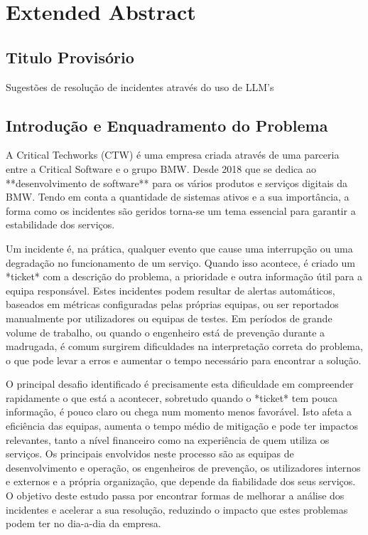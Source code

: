 
\chapter{Extended Abstract} %

\section{Titulo Provisório}
	Sugestões de resolução de incidentes através do uso de LLM’s

\section{Introdução e Enquadramento do Problema}
	A Critical Techworks (CTW) é uma empresa criada através de uma parceria entre a Critical Software e o grupo BMW. Desde 2018 que se dedica ao **desenvolvimento de software** para os vários produtos e serviços digitais da BMW. Tendo em conta a quantidade de sistemas ativos e a sua importância, a forma como os incidentes são geridos torna-se um tema essencial para garantir a estabilidade dos serviços.
	
	Um incidente é, na prática, qualquer evento que cause uma interrupção ou uma degradação no funcionamento de um serviço. Quando isso acontece, é criado um *ticket* com a descrição do problema, a prioridade e outra informação útil para a equipa responsável. Estes incidentes podem resultar de alertas automáticos, baseados em métricas configuradas pelas próprias equipas, ou ser reportados manualmente por utilizadores ou equipas de testes. Em períodos de grande volume de trabalho, ou quando o engenheiro está de prevenção durante a madrugada, é comum surgirem dificuldades na interpretação correta do problema, o que pode levar a erros e aumentar o tempo necessário para encontrar a solução.
	
	O principal desafio identificado é precisamente esta dificuldade em compreender rapidamente o que está a acontecer, sobretudo quando o *ticket* tem pouca informação, é pouco claro ou chega num momento menos favorável. Isto afeta a eficiência das equipas, aumenta o tempo médio de mitigação e pode ter impactos relevantes, tanto a nível financeiro como na experiência de quem utiliza os serviços. Os principais envolvidos neste processo são as equipas de desenvolvimento e operação, os engenheiros de prevenção, os utilizadores internos e externos e a própria organização, que depende da fiabilidade dos seus serviços. O objetivo deste estudo passa por encontrar formas de melhorar a análise dos incidentes e acelerar a sua resolução, reduzindo o impacto que estes problemas podem ter no dia-a-dia da empresa.

